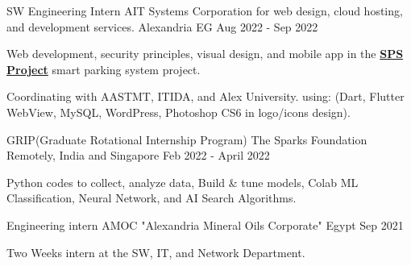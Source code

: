\begin{cventries}

    \cventry
      {SW Engineering Intern} %
      {AIT Systems Corporation for web design, cloud hosting, and development services.} %
      {Alexandria EG} %
      {Aug 2022 - Sep 2022} %
      {
        \begin{cvitems} %
          \item {Web development, security principles, visual design, and mobile app in the \textbf{\textcolor{cyan}{\href{https://github.com/AsmaaJAH/Smart-Parking-System}{SPS Project}}} smart parking system project.}
          \item {Coordinating with AASTMT, ITIDA, and Alex University. using: (Dart, Flutter WebView, MySQL, WordPress, Photoshop CS6 in logo/icons design).}
    \end{cvitems}
      }
  
  \end{cventries}
\begin{cventries}

    \cventry
      {GRIP(Graduate Rotational Internship Program)} %
      {The Sparks Foundation} %
      {Remotely, India and Singapore} %
      {Feb 2022 - April 2022} %
      {
        \begin{cvitems} %
          \item {Python codes to collect, analyze data, Build \& tune models, Colab ML Classification, Neural Network, and AI Search Algorithms. }
    \end{cvitems}
      }
  
  \end{cventries}

\begin{cventries}

    \cventry
      {Engineering intern } %
      {AMOC "Alexandria Mineral Oils Corporate"} %
      {Egypt} %
      {Sep 2021} %
      {
        \begin{cvitems} %
          \item {Two Weeks intern at the SW, IT, and Network Department.}
    \end{cvitems}
      }
  \end{cventries}
